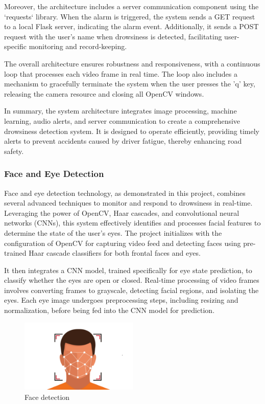 \documentclass[12pt]{article}
\begin{document}
Moreover, the architecture includes a server communication component using the `requests` library. When the alarm is triggered, the system sends a GET request to a local Flask server, indicating the alarm event. Additionally, it sends a POST request with the user's name when drowsiness is detected, facilitating user-specific monitoring and record-keeping.

The overall architecture ensures robustness and responsiveness, with a continuous loop that processes each video frame in real time. The loop also includes a mechanism to gracefully terminate the system when the user presses the 'q' key, releasing the camera resource and closing all OpenCV windows.

In summary, the system architecture integrates image processing, machine learning, audio alerts, and server communication to create a comprehensive drowsiness detection system. It is designed to operate efficiently, providing timely alerts to prevent accidents caused by driver fatigue, thereby enhancing road safety.



\subsubsection{Face and Eye Detection} 
Face and eye detection technology, as demonstrated in this project, combines several advanced techniques to monitor and respond to drowsiness in real-time. Leveraging the power of OpenCV, Haar cascades, and convolutional neural networks (CNNs), this system effectively identifies and processes facial features to determine the state of the user's eyes. The project initializes with the configuration of OpenCV for capturing video feed and detecting faces using pre-trained Haar cascade classifiers for both frontal faces and eyes.

It then integrates a CNN model, trained specifically for eye state prediction, to classify whether the eyes are open or closed. Real-time processing of video frames involves converting frames to grayscale, detecting facial regions, and isolating the eyes. Each eye image undergoes preprocessing steps, including resizing and normalization, before being fed into the CNN model for prediction. 
\begin{figure}[h]
\centering
\includegraphics[width=0.5\textwidth]{FD}
\caption{Face detection}
\end{figure}
\FloatBarrier
\end{document}

